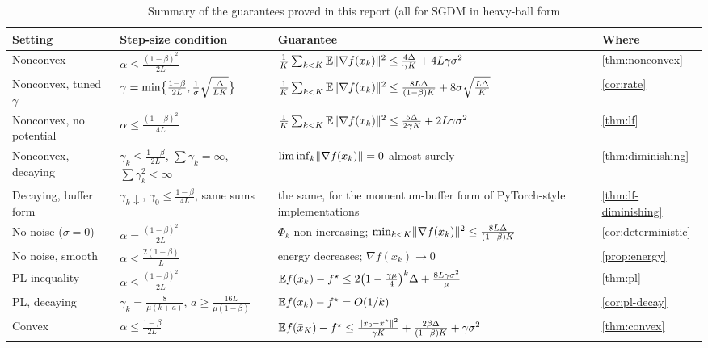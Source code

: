 \begin{table}[ht]
\centering\small
\renewcommand{\arraystretch}{1.25}
\begin{tabularx}{\textwidth}{@{}l l >{\raggedright\arraybackslash}X l@{}}
\toprule
Setting & Step-size condition & Guarantee & Where\\
\midrule
Nonconvex & $\alpha\le\frac{(1-\beta)^2}{2L}$ &
  $\frac1K\sum_{k<K}\mathbb{E}\lVert \nabla f(x_k)\rVert^2\le\frac{4\Delta}{\gamma K}+4L\gamma\sigma^2$ &
  \cref{thm:nonconvex}\\
Nonconvex, tuned $\gamma$ & $\gamma=\min\bigl\{\frac{1-\beta}{2L},\frac1\sigma\sqrt{\frac{\Delta}{LK}}\bigr\}$ &
  $\frac1K\sum_{k<K}\mathbb{E}\lVert \nabla f(x_k)\rVert^2\le\frac{8L\Delta}{(1-\beta)K}+8\sigma\sqrt{\frac{L\Delta}{K}}$ &
  \cref{cor:rate}\\
Nonconvex, no potential & $\alpha\le\frac{(1-\beta)^2}{4L}$ &
  $\frac1K\sum_{k<K}\mathbb{E}\lVert \nabla f(x_k)\rVert^2\le\frac{5\Delta}{2\gamma K}+2L\gamma\sigma^2$ &
  \cref{thm:lf}\\
Nonconvex, decaying & $\gamma_k\le\frac{1-\beta}{2L}$, $\sum\gamma_k=\infty$, $\sum\gamma_k^2<\infty$ &
  $\liminf_k\lVert \nabla f(x_k)\rVert=0$ almost surely &
  \cref{thm:diminishing}\\
Decaying, buffer form & $\gamma_k\downarrow$, $\gamma_0\le\frac{1-\beta}{4L}$, same sums &
  the same, for the momentum-buffer form of PyTorch-style implementations &
  \cref{thm:lf-diminishing}\\
No noise ($\sigma=0$) & $\alpha=\frac{(1-\beta)^2}{2L}$ &
  $\Phi_k$ non-increasing; $\min_{k<K}\lVert \nabla f(x_k)\rVert^2\le\frac{8L\Delta}{(1-\beta)K}$ &
  \cref{cor:deterministic}\\
No noise, smooth & $\alpha<\frac{2(1-\beta)}{L}$ &
  energy decreases; $\nabla f(x_k)\to0$ &
  \cref{prop:energy}\\
PL inequality & $\alpha\le\frac{(1-\beta)^2}{2L}$ &
  $\mathbb{E} f(x_k)-f^\star\le2\bigl(1-\frac{\gamma\mu}{4}\bigr)^k\Delta+\frac{8L\gamma\sigma^2}{\mu}$ &
  \cref{thm:pl}\\
PL, decaying & $\gamma_k=\frac{8}{\mu(k+a)}$, $a\ge\frac{16L}{\mu(1-\beta)}$ &
  $\mathbb{E} f(x_k)-f^\star=O(1/k)$ &
  \cref{cor:pl-decay}\\
Convex & $\alpha\le\frac{1-\beta}{2L}$ &
  $\mathbb{E} f(\bar x_K)-f^\star\le\frac{\lVert x_0-x^\star\rVert^2}{\gamma K}+\frac{2\beta\Delta}{(1-\beta)K}+\gamma\sigma^2$ &
  \cref{thm:convex}\\
\bottomrule
\end{tabularx}
\caption{Summary of the guarantees proved in this report (all for SGDM in heavy-ball form
}
\end{table}
